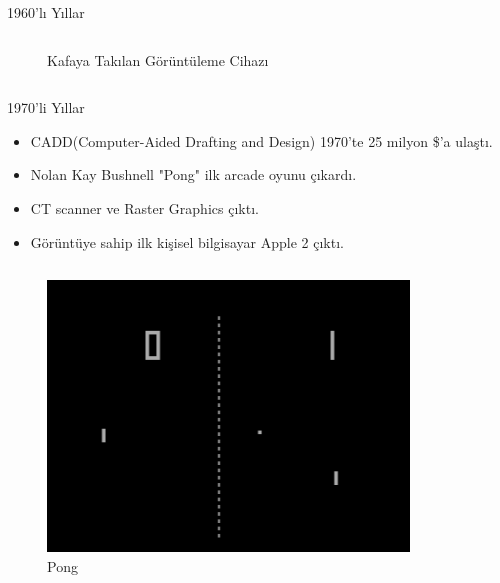 \documentclass{beamer}
\begin{document}
\begin{frame}[fragile]{1960'lı Yıllar}
\begin{columns}
\begin{column}{0.4\textwidth}
\begin{figure}
\caption{Kafaya Takılan Görüntüleme Cihazı }
\end{figure}
\end{column}
\end{columns}
\end{frame}

\begin{frame}{1970'li Yıllar}
\begin{itemize}
\item CADD(Computer-Aided Drafting and Design) 1970'te 25 milyon \$'a ulaştı.
\item Nolan Kay Bushnell "Pong" ilk arcade oyunu çıkardı.
\item CT scanner ve Raster Graphics çıktı.
\item Görüntüye sahip ilk kişisel bilgisayar Apple 2 çıktı.
\end{itemize}
\begin{columns}
\begin{column}{0.4\textwidth}
\begin{figure}
\includegraphics[width=\textwidth]{Pong.png}
\caption{Pong}
\end{figure}
\end{column}
\begin{column}{0.4\textwidth}
\begin{figure}

\end{figure}
\end{column}
\end{columns}
\end{frame}
\end{document}
